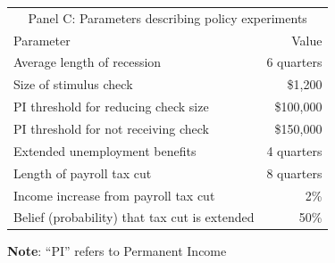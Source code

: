 \documentclass[\latexroot/\projectname]{subfiles}
\begin{document}
\begin{table}[tb]
  \begin{tabular*}
    {\textwidth}{@{\extracolsep{\fill}}lr@{}}
    \multicolumn{2}{c}{\small Panel C: Parameters describing policy experiments} \\
    \addlinespace
    \hline
    Parameter                                        & Value \\ \hline
    Average length of recession                      & 6 quarters \\
    Size of stimulus check                           & \$1,200 \\
    PI threshold for reducing check size             & \$100,000 \\
    PI threshold for not receiving check             & \$150,000 \\
    Extended unemployment benefits                   & 4 quarters \\
    Length of payroll tax cut                        & 8 quarters \\
    Income increase from payroll tax cut             & 2\% \\
    Belief (probability) that tax cut is extended    & 50\% \\
    \hline
  \end{tabular*}

  \vspace{0.5em}
  \noindent\parbox{\textwidth}{\footnotesize
    \textbf{Note}: ``PI'' refers to Permanent Income}
  \vspace{0.5em}
\end{table}

\smartbib
\end{document}

